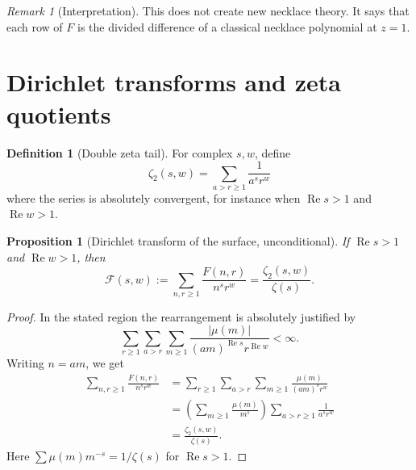\documentclass[11pt]{amsart}
\numberwithin{equation}{section}
\theoremstyle{plain}
\newtheorem{proposition}[theorem]{Proposition}
\theoremstyle{definition}
\newtheorem{definition}[theorem]{Definition}
\theoremstyle{remark}
\newtheorem{remark}[theorem]{Remark}
\newcommand{\mob}{\mu}
\newcommand{\zetaR}{\zeta}
\newcommand{\Fsurf}{F}
\begin{document}
\begin{remark}[Interpretation]
\label{rem:necklace_interpretation}
This does not create new necklace theory.  It says that each row of \(\Fsurf\) is the divided difference of a classical necklace polynomial at \(z=1\).
\end{remark}

\section{Dirichlet transforms and zeta quotients}
\label{sec:dirichlet_transforms}

\begin{definition}[Double zeta tail]
\label{def:zeta2}
For complex \(s,w\), define
\begin{equation}
\zetaR_2(s,w)=\sum_{a>r\ge1}\frac1{a^s r^w}
\label{eq:zeta2_def}
\end{equation}
where the series is absolutely convergent, for instance when \(\operatorname{Re}s>1\) and \(\operatorname{Re}w>1\).
\end{definition}

\begin{proposition}[Dirichlet transform of the surface, unconditional]
\label{prop:F_transform}
If \(\operatorname{Re}s>1\) and \(\operatorname{Re}w>1\), then
\begin{equation}
\mathscr F(s,w):=\sum_{n,r\ge1}\frac{\Fsurf(n,r)}{n^s r^w}=\frac{\zetaR_2(s,w)}{\zetaR(s)}.
\label{eq:F_transform}
\end{equation}
\end{proposition}

\begin{proof}
In the stated region the rearrangement is absolutely justified by
\begin{equation}
\sum_{r\ge1}\sum_{a>r}\sum_{m\ge1}\frac{|\mob(m)|}{(am)^{\operatorname{Re}s}r^{\operatorname{Re}w}}<\infty.
\label{eq:F_transform_absolute}
\end{equation}
Writing \(n=am\), we get
\begin{align}
\sum_{n,r\ge1}\frac{\Fsurf(n,r)}{n^s r^w}
&=\sum_{r\ge1}\sum_{a>r}\sum_{m\ge1}\frac{\mob(m)}{(am)^s r^w} \\
&=\left(\sum_{m\ge1}\frac{\mob(m)}{m^s}\right)\sum_{a>r\ge1}\frac1{a^s r^w} \\
&=\frac{\zetaR_2(s,w)}{\zetaR(s)}.
\label{eq:F_transform_proof}
\end{align}
Here \(\sum \mob(m)m^{-s}=1/\zetaR(s)\) for \(\operatorname{Re}s>1\).
\end{proof}
\end{document}
